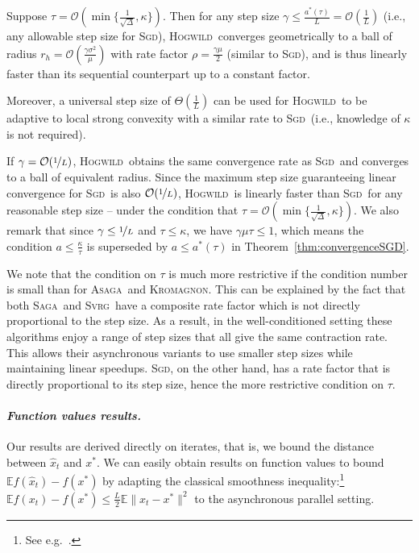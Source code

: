 \documentclass[twoside, 11pt]{article}
\newcommand{\stepsize}{\gamma}
\newcommand{\strongconvex}{\mu}
\newcommand{\overlap}{\tau}
\newcommand{\contraction}{\rho}
\newcommand{\sparsity}{\Delta}
\newcommand{\lipschitz}{L}
\newcommand{\E}{\mathbb{E}}
\newcommand{\ASAGA}{\textsc{Asaga}}
\newcommand{\SAGA}{\textsc{Saga}}
\newcommand{\SVRG}{\textsc{Svrg}}
\newcommand{\Hogwild}{\textsc{Hogwild}}
\newcommand{\SGD}{\textsc{Sgd}}
\newcommand{\KROMAGNON}{\textsc{Kromagnon}}
\begin{document}
\begin{corollary}\label{thm:bigdataSGD}
	Suppose $\overlap = \mathcal{O}({\min\{\frac{1}{\sqrt{\sparsity}}}, \kappa\})$.
	Then for any step size $\stepsize \leq \frac{a^*(\overlap)}{\lipschitz} = \mathcal{O}(\frac{1}{\lipschitz})$ (i.e., any allowable step size for \SGD), \Hogwild\ converges geometrically to a ball of radius $r_h = \mathcal{O}(\frac{\stepsize \sigma^2}{\strongconvex})$ with rate factor $\contraction = \frac{\stepsize \strongconvex}{2}$ (similar to \SGD), and is thus linearly faster than its sequential counterpart up to a constant factor.

	Moreover, a universal step size of $\Theta(\frac{1}{L})$ can be used for \Hogwild\ to be adaptive to local strong convexity with a similar rate to \SGD\ (i.e., knowledge of $\kappa$ is not required).
\end{corollary}
If $\stepsize = \mathcal{O}(\nicefrac{1}{\lipschitz})$, \Hogwild\ obtains the same convergence rate as \SGD\ and converges to a ball of equivalent radius.
Since the maximum step size guaranteeing linear convergence for \SGD\ is also $\mathcal{O}(\nicefrac{1}{\lipschitz})$, \Hogwild\ is linearly faster than \SGD\ for any reasonable step size -- under the condition that $\overlap = \mathcal{O}({\min\{\frac{1}{\sqrt{\sparsity}}}, \kappa\})$.
We also remark that since $\stepsize \leq \nicefrac{1}{\lipschitz}$ and $\overlap \leq \kappa$, we have $\stepsize \strongconvex \overlap \leq 1$, which means the condition $a \leq \frac{\kappa}{\overlap}$ is superseded by $a\leq a^*(\overlap)$ in Theorem~\ref{thm:convergenceSGD}.

We note that the condition on $\overlap$ is much more restrictive if the condition number is small than for \ASAGA\ and \KROMAGNON.
This can be explained by the fact that both \SAGA\ and \SVRG\ have a composite rate factor which is not directly proportional to the step size.
As a result, in the well-conditioned setting these algorithms enjoy a range of step sizes that all give the same contraction rate.
This allows their asynchronous variants to use smaller step sizes while maintaining linear speedups.
\SGD, on the other hand, has a rate factor that is directly proportional to its step size, hence the more restrictive condition on $\overlap$.

\paragraph{\textit{Function values results.}}
Our results are derived directly on iterates, that is, we bound the distance between $\hat x_t$ and $x^*$.
We can easily obtain results on function values to bound ${\E f(\hat x_t) - f(x^*)}$ by adapting the classical smoothness inequality:\footnote{See e.g.~\citet{bachandm}.}
${\E f(x_t) - f(x^*) }\leq {\frac{\lipschitz}{2} \E \|x_t - x^*\|^2}$ to the asynchronous parallel setting.
\end{document}
